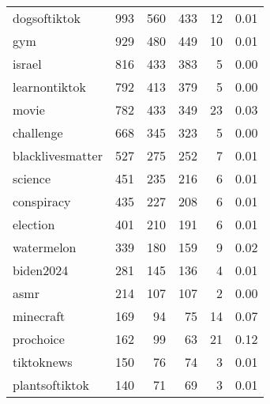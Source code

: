 \begin{tabular}{lrrrrr}
    dogsoftiktok &    993 &    560 &           433 &                         12 &                                0.01 \\
             gym &    929 &    480 &           449 &                         10 &                                0.01 \\
          israel &    816 &    433 &           383 &                          5 &                                0.00 \\
   learnontiktok &    792 &    413 &           379 &                          5 &                                0.00 \\
           movie &    782 &    433 &           349 &                         23 &                                0.03 \\
       challenge &    668 &    345 &           323 &                          5 &                                0.00 \\
blacklivesmatter &    527 &    275 &           252 &                          7 &                                0.01 \\
         science &    451 &    235 &           216 &                          6 &                                0.01 \\
      conspiracy &    435 &    227 &           208 &                          6 &                                0.01 \\
        election &    401 &    210 &           191 &                          6 &                                0.01 \\
      watermelon &    339 &    180 &           159 &                          9 &                                0.02 \\
       biden2024 &    281 &    145 &           136 &                          4 &                                0.01 \\
            asmr &    214 &    107 &           107 &                          2 &                                0.00 \\
       minecraft &    169 &     94 &            75 &                         14 &                                0.07 \\
       prochoice &    162 &     99 &            63 &                         21 &                                0.12 \\
      tiktoknews &    150 &     76 &            74 &                          3 &                                0.01 \\
  plantsoftiktok &    140 &     71 &            69 &                          3 &                                0.01 \\

\end{tabular}
